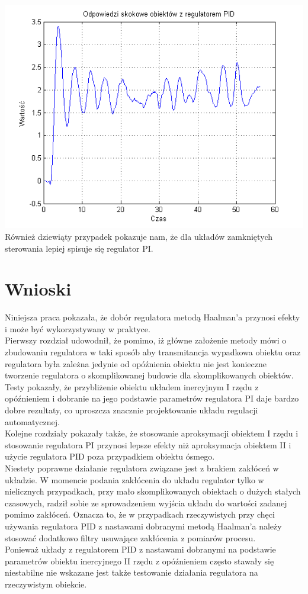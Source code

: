 \documentclass[10pt,a4paper]{article}
\begin{document}
\includegraphics[scale=1]{images/cztery/skrypt_20.png}\\
\newpage
Również dziewiąty przypadek pokazuje nam, że dla układów zamkniętych sterowania lepiej spisuje się regulator PI.
\newpage

\section{Wnioski}

Niniejsza praca pokazała, że dobór regulatora metodą Haalman'a przynosi efekty i może być wykorzystywany w praktyce.\\
Pierwszy rozdział udowodnił, że pomimo, iż główne założenie metody mówi o zbudowaniu regulatora w taki sposób aby transmitancja wypadkowa obiektu oraz regulatora była zależna jedynie od opóźnienia obiektu nie jest konieczne tworzenie regulatora o skomplikowanej budowie dla skomplikowanych obiektów. Testy pokazały, że przybliżenie obiektu układem inercyjnym I rzędu z opóźnieniem i dobranie na jego podstawie parametrów regulatora PI daje bardzo dobre rezultaty, co uproszcza znacznie projektowanie układu regulacji automatycznej.\\
Kolejne rozdziały pokazały także, że stosowanie aproksymacji obiektem I rzędu i stosowanie regulatora PI przynosi lepsze efekty niż aproksymacja obiektem II i użycie regulatora PID poza przypadkiem obiektu ósmego.\\ Niestety poprawne działanie regulatora związane jest z brakiem zakłóceń w układzie. W momencie podania zakłócenia do układu regulator tylko w nielicznych przypadkach, przy mało skomplikowanych obiektach o dużych stałych czasowych, radził sobie ze sprowadzeniem wyjścia układu do wartości zadanej pomimo zakłóceń. Oznacza to, że w przypadkach rzeczywistych przy chęci używania regulatora PID z nastawami dobranymi metodą Haalman'a należy stosować dodatkowo filtry usuwające zakłócenia z pomiarów procesu. \\
Ponieważ układy z regulatorem PID z nastawami dobranymi na podstawie parametrów obiektu inercyjnego II rzędu z opóźnieniem często stawały się niestabilne nie wskazane jest także testowanie działania regulatora na rzeczywistym obiekcie.  
\end{document}
